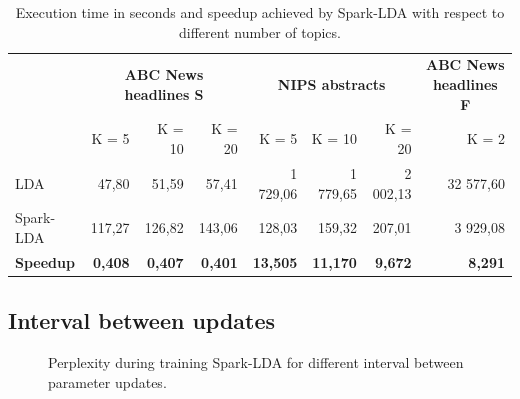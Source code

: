 \documentclass[journal]{IEEEtran}
\begin{document}
\begin{table}[t]
\centering
\caption{Execution time in seconds and speedup achieved by Spark-LDA with respect to different number of topics.}
\begin{tabular}{lrrrrrrr} \toprule
                 & \multicolumn{3}{c}{\textbf{ABC News headlines S}} & \multicolumn{3}{c}{\textbf{NIPS abstracts}}        & \multicolumn{1}{c}{\textbf{ABC News headlines F}} \\
                 & K = 5             & K = 10           & K = 20           & K = 5           & K = 10          & K = 20         & K = 2                                           \\ \midrule
LDA              & 47,80             & 51,59            & 57,41            & 1 729,06        & 1 779,65        & 2 002,13       & 32 577,60                                       \\
Spark-LDA        & 117,27            & 126,82           & 143,06           & 128,03          & 159,32          & 207,01         & 3 929,08                                        \\ \midrule
\textbf{Speedup} & \textbf{0,408}    & \textbf{0,407}   & \textbf{0,401}   & \textbf{13,505} & \textbf{11,170} & \textbf{9,672} & \textbf{8,291}  \\ \bottomrule                         
\end{tabular}
\label{tab:speedup}
\end{table}

\subsection{Interval between updates}

\begin{figure}[t]
\centering
{}
\hfil
{}
\caption{Perplexity during training Spark-LDA for different interval between parameter updates.}
\label{fig_sim}
\end{figure}
\end{document}

